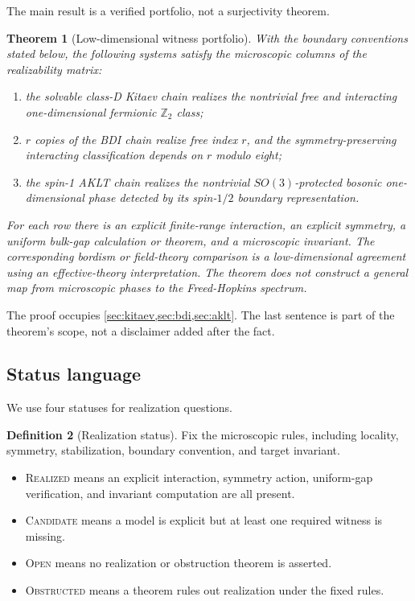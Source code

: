 \documentclass[12pt]{article}
\newtheorem{theorem}{Theorem}[section]
\theoremstyle{definition}
\newtheorem{definition}[theorem]{Definition}
\theoremstyle{remark}
\newcommand{\REAL}{\textnormal{\textsc{Realized}}}
\newcommand{\CAND}{\textnormal{\textsc{Candidate}}}
\newcommand{\OPEN}{\textnormal{\textsc{Open}}}
\newcommand{\OBST}{\textnormal{\textsc{Obstructed}}}
\begin{document}
The main result is a verified portfolio, not a surjectivity theorem.

\begin{theorem}[Low-dimensional witness portfolio]
\label{thm:portfolio}
With the boundary conventions stated below, the following systems satisfy
the microscopic columns of the realizability matrix:

\begin{enumerate}[leftmargin=2.2em]
\item the solvable class-D Kitaev chain realizes the nontrivial free and
interacting one-dimensional fermionic $\mathbb Z_2$ class;
\item $r$ copies of the BDI chain realize free index $r$, and the
symmetry-preserving interacting classification depends on $r$ modulo eight;
\item the spin-1 AKLT chain realizes the nontrivial $SO(3)$-protected bosonic
one-dimensional phase detected by its spin-$1/2$ boundary representation.
\end{enumerate}

For each row there is an explicit finite-range interaction, an explicit
symmetry, a uniform bulk-gap calculation or theorem, and a microscopic
invariant.  The corresponding bordism or field-theory comparison is a
low-dimensional agreement using an effective-theory interpretation.  The
theorem does not construct a general map from microscopic phases to the
Freed-Hopkins spectrum.
\end{theorem}

The proof occupies \cref{sec:kitaev,sec:bdi,sec:aklt}.  The last sentence is
part of the theorem's scope, not a disclaimer added after the fact.

\subsection{Status language}

We use four statuses for realization questions.

\begin{definition}[Realization status]
Fix the microscopic rules, including locality, symmetry, stabilization,
boundary convention, and target invariant.

\begin{itemize}[leftmargin=2.1em]
\item \REAL{} means an explicit interaction, symmetry action, uniform-gap
verification, and invariant computation are all present.
\item \CAND{} means a model is explicit but at least one required witness is
missing.
\item \OPEN{} means no realization or obstruction theorem is asserted.
\item \OBST{} means a theorem rules out realization under the fixed rules.
\end{itemize}
\end{definition}
\end{document}
